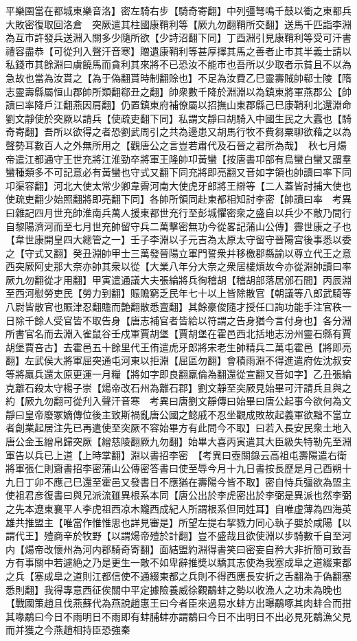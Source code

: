 平樂圉當在都城東樂音洛】密左騎右步【騎奇寄翻】中列彊弩鳴千鼓以衝之東都兵大敗密復取回洛倉　突厥遣其柱國康鞘利等【厥九勿翻鞘所交翻】送馬千匹詣李淵為互市許發兵送淵入關多少隨所欲【少詩沼翻下同】丁酉淵引見康鞘利等受可汗書禮容盡恭【可從刋入聲汗音寒】贈遺康鞘利等甚厚擇其馬之善者止市其半義士請以私錢市其餘淵曰虜饒馬而貪利其來將不已恐汝不能市也吾所以少取者示貧且不以為急故也當為汝貰之【為于偽翻貰時制翻賒也】不足為汝費乙巳靈壽賊帥郗士陵【隋志靈壽縣屬恒山郡帥所類翻郗丑之翻】帥衆數千降於淵淵以為鎮東將軍燕郡公【帥讀曰率降戶江翻燕因肩翻】仍置鎮東府補僚屬以招撫山東郡縣己巳康鞘利北還淵命劉文靜使於突厥以請兵【使疏吏翻下同】私謂文靜曰胡騎入中國生民之大蠧也【騎奇寄翻】吾所以欲得之者恐劉武周引之共為邊患又胡馬行牧不費芻粟聊欲藉之以為聲勢耳數百人之外無所用之【觀唐公之言豈若肅代及石晉之君所為哉】　秋七月煬帝遣江都通守王世充將江淮勁卒將軍王隆帥卭黃蠻【按唐書卭部有烏蠻白蠻又謂羣蠻種類多不可記意必有黃蠻也守式又翻下同充將即亮翻又音如字領也帥讀曰率下同卭渠容翻】河北大使太常少卿韋霽河南大使虎牙郎將王辯等【二人蓋皆討捕大使也使疏吏翻少始照翻將即亮翻下同】各帥所領同赴東都相知討李密【帥讀曰率　考異曰雜記四月世充帥淮南兵萬人援東都世充行至彭城懼密衆之盛自以兵少不敵乃間行自黎陽濟河而至七月世充帥留守兵二萬擊密無功今從畧記蒲山公傳】霽世康之子也【韋世康開皇四大總管之一】壬子李淵以子元吉為太原太守留守晉陽宫後事悉以委之【守式又翻】癸丑淵帥甲士三萬發晉陽立軍門誓衆并移檄郡縣諭以尊立代王之意西突厥阿史那大奈亦帥其衆以從【大業八年分大奈之衆居樓煩故今亦從淵帥讀曰率厥九勿翻從才用翻】甲寅遣通議大夫張綸將兵徇稽胡【稽胡部落居邠石間】丙辰淵至西河慰勞吏民【勞力到翻】賑贍窮乏民年七十以上皆除散官【朝議等八郎武騎等八尉皆散官也賑津忍翻贍而艶翻散悉亶翻】其餘豪俊隨才授任口詢功能手注官秩一日除千餘人受官皆不取告身【唐志補官者皆給以符謂之告身猶今言付身也】各分淵所書官名而去淵入雀鼠谷壬戍軍賈胡堡【賈胡堡在霍邑西北括地志汾州靈石縣有賈胡堡賈咅古】去霍邑五十餘里代王侑遣虎牙郎將宋老生帥精兵二萬屯霍邑【將即亮翻】左武侯大將軍屈突通屯河東以拒淵【屈區勿翻】會積雨淵不得進遣府佐沈叔安等將羸兵還太原更運一月糧【將如字即良翻羸倫為翻還從宣翻又音如字】乙丑張綸克離石殺太守楊子崇【煬帝改石州為離石郡】劉文靜至突厥見始畢可汗請兵且與之約【厥九勿翻可從刋入聲汗音寒　考異曰唐劉文靜傳曰始畢曰唐公起事今欲何為文靜曰皇帝廢冢嫡傳位後主致斯禍亂唐公國之懿戚不忍坐觀成敗故起義軍欲黜不當立者創業起居注先已再遣使至突厥不容始畢方有此問今不取】曰若入長安民衆土地入唐公金玉繒帛歸突厥【繒慈陵翻厥九勿翻】始畢大喜丙寅遣其大臣級失特勒先至淵軍告以兵已上道【上時掌翻】淵以書招李密　【考異曰壺關錄云高祖屯壽陽遣右衛將軍張仁則齎書招李密蒲山公傳密答書曰使至辱今月十九日書按長歷是月己酉朔十九日丁卯不應己巳還至霍邑又發書日不應猶在壽陽今皆不取】密自恃兵彊欲為盟主使祖君彦復書曰與兄派流雖異根系本同【唐公出於李虎密出於李弼是異派也然李弼之先本遼東襄平人李虎祖西凉木隴西成紀人所謂根系但同姓耳】自唯虚薄為四海英雄共推盟主【唯當作惟惟思也詳見審是】所望左提右挈戮力同心執子嬰於咸陽【以謂代王】殪商辛於牧野【以謂煬帝殪於計翻】豈不盛哉且欲使淵以步騎數千自至河内【煬帝改懷州為河内郡騎奇寄翻】面結盟約淵得書笑曰密妄自矜大非折簡可致吾方有事關中若遽絶之乃是更生一敵不如卑辭推奬以驕其志使為我塞成臯之道綴東都之兵【塞成臯之道則江都信使不通綴東都之兵則不得西應長安折之舌翻為于偽翻塞悉則翻】我得專意西征俟關中平定據險養威徐觀鷸蚌之勢以收漁人之功未為晚也【戰國策趙且伐燕蘇代為燕說趙惠王曰今者臣來過易水蚌方出曝鷸啄其肉蚌合而拑其喙鷸曰今日不雨明日不雨即有蚌脯蚌亦謂鷸曰今日不出明日不出必見死鷸漁父見而并獲之今燕趙相持臣恐強秦